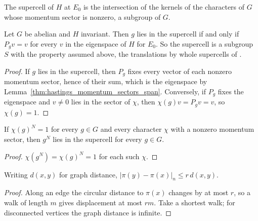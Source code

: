 \begin{definition}
    \label{def:hastings_supercell_of_momenta}
    \leanok
    The supercell of $H$ at $E_0$ is the intersection of the kernels of the
    characters of $G$ whose momentum sector is nonzero, a subgroup of $G$.
\end{definition}

\begin{lemma}
    \label{thm:hastings_supercell_of_momenta}
    \leanok
    Let $G$ be abelian and $H$ invariant. Then $g$ lies in the supercell if and
    only if $P_gv=v$ for every $v$ in the eigenspace of $H$ for $E_0$. So the
    supercell is a subgroup $S$ with the property assumed above, the
    translations by whole supercells of
    \cite[lines 1626--1630]{Hastings2006Solving}.
\end{lemma}
\begin{proof}\leanok
    If $g$ lies in the supercell, then $P_g$ fixes every vector of each nonzero
    momentum sector, hence of their sum, which is the eigenspace by
    Lemma~\ref{thm:hastings_momentum_sectors_span}. Conversely, if $P_g$ fixes
    the eigenspace and $v\ne0$ lies in the sector of $\chi$, then
    $\chi(g)v=P_gv=v$, so $\chi(g)=1$.
\end{proof}

\begin{lemma}
    \label{thm:hastings_supercell_pow}
    \leanok
    If $\chi(g)^N=1$ for every $g\in G$ and every character $\chi$ with a nonzero
    momentum sector, then $g^N$ lies in the supercell for every $g\in G$.
\end{lemma}
\begin{proof}\leanok
    $\chi(g^N)=\chi(g)^N=1$ for each such $\chi$.
\end{proof}

\begin{lemma}
    \label{thm:hastings_cell_distance_le}
    \leanok
    Writing $d(x,y)$ for graph distance,
    $|\pi(y)-\pi(x)|_n\le r\,d(x,y)$.
\end{lemma}
\begin{proof}\leanok
    Along an edge the circular distance to $\pi(x)$ changes by at most $r$,
    so a walk of length $m$ gives displacement at most $rm$. Take a shortest
    walk; for disconnected vertices the graph distance is infinite.
\end{proof}

